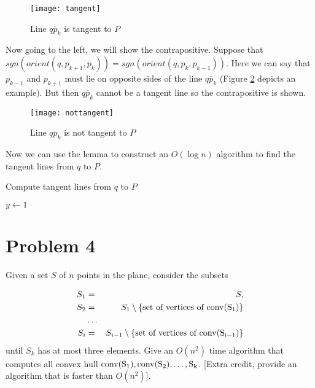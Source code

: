 \documentclass[11pt]{article}
\newcommand{\conv}[1]{\rm{conv}(#1)}
\begin{document}
\begin{figure}[h]
    \centering
    \texttt{[image: tangent]}
    \caption{Line $\overline{q p_k}$ is tangent to $P$}
    \label{fig:tangent}
\end{figure}

Now going to the left, we will show the contrapositive.
Suppose that $sgn(orient(q, p_{k+1}, p_k)) = sgn(orient(q, p_k, p_{k-1}))$.
Here we can say that $p_{k-1}$ and $p_{k+1}$ must lie on opposite sides of the line $\overline{q p_k}$ (Figure \ref{fig:nottangent} depicts an example).
But then $\overline{q p_k}$ cannot be a tangent line so the contrapositive is shown.

\begin{figure}[h]
    \centering
    \texttt{[image: nottangent]}
    \caption{Line $\overline{q p_k}$ is not tangent to $P$}
    \label{fig:nottangent}
\end{figure}

Now we can use the lemma to construct an $O(\log n)$ algorithm to find the tangent lines from $q$ to $P$.

\begin{algorithm}
    \caption{Compute tangent lines from $q$ to $P$}
    \begin{algorithmic}
        \State $y \gets 1$
    \end{algorithmic}
\end{algorithm}

\newpage
\section*{Problem 4}

Given a set $S$ of $n$ points in the plane, consider the subsets

\begin{eqnarray*}
	S_1 &=& S, \\
	S_2 &=& S_1 \setminus \{ \text{set of vertices of } \conv{S_1} \} \\
		&\ldots& \\
	S_i &=& S_{i-1} \setminus \{ \text{set of vertices of } \conv{S_{i-1}} \}
\end{eqnarray*}
%
until $S_k$ has at most three elements.  Give an $O(n^2)$ time algorithm that
computes all convex hull $\conv{S_1}, \conv{S_2}, \ldots, S_k$.  [Extra credit,
provide an algorithm that is faster than $O(n^2)$]. \\

\end{document}
